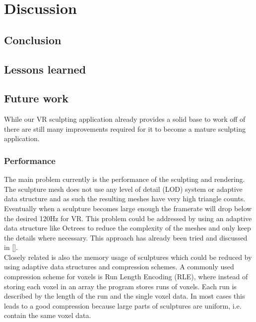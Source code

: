 \chapter{Discussion}

\section{Conclusion}

\section{Lessons learned}

\section{Future work}

While our VR sculpting application already provides a solid base to work off of there are still many improvements required for it to become a mature sculpting application.

\subsection{Performance}
The main problem currently is the performance of the sculpting and rendering. The sculpture mesh does not use any level of detail (LOD) system or adaptive data structure and as such the resulting meshes have very high triangle counts.
Eventually when a sculpture becomes large enough the framerate will drop below the desired 120Hz for VR. This problem could be addressed by using an adaptive data structure like Octrees to reduce the complexity of the meshes and only keep the details where necessary. This approach has already been tried and discussed in [].\\
Closely related is also the memory usage of sculptures which could be reduced by using adaptive data structures and compression schemes. A commonly used compression scheme for voxels is Run Length Encoding (RLE), where instead of storing
each voxel in an array the program stores runs of voxels. Each run is described by the length of the run and the single voxel data. In most cases this leads to a good compression because large parts of sculptures are uniform, i.e. contain the same voxel data.

